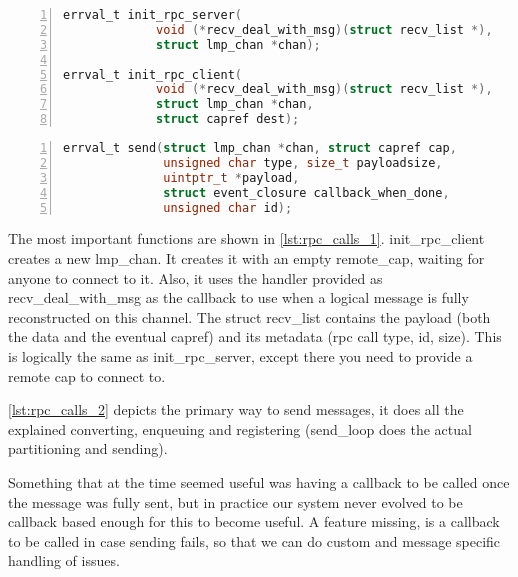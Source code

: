 \begin{lstlisting}[caption={RPC init function prototypes}, 
label=lst:rpc_calls_1, numbers=left, stepnumber=1, float, floatplacement=tl, 
frame=tb, language=c]
errval_t init_rpc_server(
             void (*recv_deal_with_msg)(struct recv_list *),
             struct lmp_chan *chan);

errval_t init_rpc_client(
             void (*recv_deal_with_msg)(struct recv_list *),
             struct lmp_chan *chan, 
             struct capref dest);
\end{lstlisting}
\begin{lstlisting}[caption={RPC send function prototype}, 
label=lst:rpc_calls_2, numbers=left, stepnumber=1, float, floatplacement=tl, 
frame=tb, language=c]
errval_t send(struct lmp_chan *chan, struct capref cap, 
              unsigned char type, size_t payloadsize, 
              uintptr_t *payload, 
              struct event_closure callback_when_done, 
              unsigned char id);
\end{lstlisting}

The most important functions are shown in \autoref{lst:rpc_calls_1}.
init\_rpc\_client creates a new lmp\_chan. It 
creates it with an empty remote\_cap, waiting for anyone to connect to it. 
Also, it uses the handler provided as recv\_deal\_with\_msg as the callback to 
use when a logical message is fully reconstructed on this channel. The struct 
recv\_list contains the payload (both the data and the eventual capref) 
and its metadata (rpc call type, id, size).
This is logically the same as init\_rpc\_server, except there you need to provide 
 a remote cap to connect to.
\medskip

\autoref{lst:rpc_calls_2} depicts the primary way to send messages, it does 
all the explained converting, enqueuing and registering (send\_loop does the 
actual partitioning and sending).
\medskip

Something that at the time seemed useful was having a callback to be called 
once the message was fully sent, but in practice our system never evolved to 
be callback based enough for this to become useful. 
A feature missing, is a callback to be called in case sending fails, so 
that we can do custom and message specific handling of issues.
\medskip

